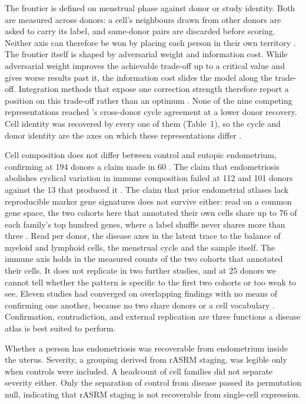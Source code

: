 The \elaj frontier is defined on menstrual phase against donor or study
identity. Both are measured across donors: a cell's neighbours drawn from
other donors are asked to carry its label, and same-donor pairs are discarded
before scoring. Neither axis can therefore be won by placing each person in
their own territory \citep{squair2021confronting}. The frontier itself is
shaped by adversarial weight and information cost. While adversarial weight 
improves the achievable trade-off up to a critical value and gives worse results 
past it, the information cost slides the model along the trade-off. Integration
methods that expose one correction strength therefore report a position on
this trade-off rather than an optimum
\citep{korsunsky2019harmony,lopez2018scvi,xu2021scanvi,hie2019scanorama}.
None of the nine competing representations reached \elaj's cross-donor cycle
agreement at a lower donor recovery. Cell identity was recovered by every one
of them (Table~1), so the cycle and donor identity are the axes on which these 
representations differ \citep{luecken2022benchmarking}.

Cell composition does not differ between control and eutopic endometrium,
confirming at 194 donors a claim made in 60
\citep{duempelmann2026endometrium}. The claim that endometriosis abolishes
cyclical variation in immune composition failed at 112 and 101 donors against
the 13 that produced it \citep{huang2023immune}. The claim that prior
endometrial atlases lack reproducible marker gene signatures does not survive
either: read on a common gene space, the two cohorts here that annotated
their own cells share up to 76 of each family's top hundred genes, where a
label shuffle never shares more than three \citep{mareckova2024heca}. Read per donor, the
disease axes in the latent trace to the balance of myeloid and lymphoid
cells, the menstrual cycle and the sample itself. The immune axis holds in
the measured counts of the two cohorts that annotated their cells. It does
not replicate in two further studies, and at 25 donors we cannot tell
whether the pattern is specific to the first two cohorts or too weak to
see. Eleven
studies had converged on overlapping findings with no means of confirming one
another, because no two share donors or a cell vocabulary
\citep{mareckova2024heca}. Confirmation, contradiction, and external
replication are three functions a disease atlas is best suited to perform.

Whether a person has endometriosis was recoverable from endometrium inside the
uterus. Severity, a grouping derived from rASRM staging, was legible only when
controls were included. A headcount of cell families did not separate severity
either. Only the separation of control from disease passed its permutation
null, indicating that rASRM staging is not recoverable from single-cell
expression.

